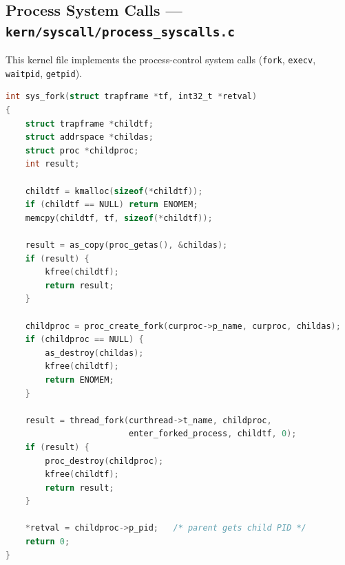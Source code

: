 \documentclass[11pt,a4paper]{article}
\begin{document}
\FloatBarrier
\newpage
\subsection{Process System Calls ---
            \texttt{kern/syscall/process\_syscalls.c}}
This kernel file implements the process-control system calls
(\texttt{fork}, \texttt{execv}, \texttt{waitpid}, \texttt{getpid}).

\begin{lstlisting}[language=C,
  caption={\texttt{sys\_fork} --- duplicate the trapframe and address
           space, then create a child thread.}]
int sys_fork(struct trapframe *tf, int32_t *retval)
{
	struct trapframe *childtf;
	struct addrspace *childas;
	struct proc *childproc;
	int result;

	childtf = kmalloc(sizeof(*childtf));
	if (childtf == NULL) return ENOMEM;
	memcpy(childtf, tf, sizeof(*childtf));

	result = as_copy(proc_getas(), &childas);
	if (result) {
		kfree(childtf);
		return result;
	}

	childproc = proc_create_fork(curproc->p_name, curproc, childas);
	if (childproc == NULL) {
		as_destroy(childas);
		kfree(childtf);
		return ENOMEM;
	}

	result = thread_fork(curthread->t_name, childproc,
	                     enter_forked_process, childtf, 0);
	if (result) {
		proc_destroy(childproc);
		kfree(childtf);
		return result;
	}

	*retval = childproc->p_pid;   /* parent gets child PID */
	return 0;
}
\end{lstlisting}
\end{document}
